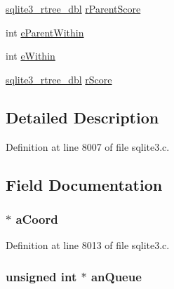 \begin{DoxyCompactItemize}
\item 
\hyperlink{sqlite3_8c_ae9156ff58620c1ceae9391f1afabae1b}{sqlite3\+\_\+rtree\+\_\+dbl} \hyperlink{structsqlite3__rtree__query__info_a95ec5d09980e043fcd87ecae7363cd5e}{r\+Parent\+Score}
\item 
int \hyperlink{structsqlite3__rtree__query__info_a0a9853fdd3126a79b0bf75726e6e1fd8}{e\+Parent\+Within}
\item 
int \hyperlink{structsqlite3__rtree__query__info_acd45df5e23dec3a76d7f947918d812d5}{e\+Within}
\item 
\hyperlink{sqlite3_8c_ae9156ff58620c1ceae9391f1afabae1b}{sqlite3\+\_\+rtree\+\_\+dbl} \hyperlink{structsqlite3__rtree__query__info_ac027329f98ab575b6a491de532c688a1}{r\+Score}
\end{DoxyCompactItemize}


\subsection{Detailed Description}


Definition at line 8007 of file sqlite3.\+c.



\subsection{Field Documentation}
\hypertarget{structsqlite3__rtree__query__info_a65ecb5e2c6c6ab1302a62d63d3955408}{}
\subsubsection[{a\+Coord}]{ $\ast$ a\+Coord}\label{structsqlite3__rtree__query__info_a65ecb5e2c6c6ab1302a62d63d3955408}


Definition at line 8013 of file sqlite3.\+c.

\hypertarget{structsqlite3__rtree__query__info_ae21e3f4dc35e156904ecce486ac2e4d0}{}
\subsubsection[{an\+Queue}]{\setlength{\rightskip}{0pt plus 5cm}unsigned int $\ast$ an\+Queue}\label{structsqlite3__rtree__query__info_ae21e3f4dc35e156904ecce486ac2e4d0}


